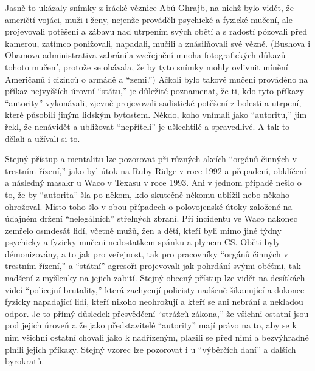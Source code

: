 \documentclass{book}
\begin{document}
Jasně to ukázaly snímky z irácké věznice Abú Ghrajb, na nichž bylo vidět, že američtí vojáci, muži i ženy, nejenže prováděli psychické a fyzické mučení, ale projevovali potěšení a zábavu nad utrpením svých obětí a s radostí pózovali před kamerou, zatímco ponižovali, napadali, mučili a znásilňovali své vězně. (Bushova i Obamova administrativa zabránila zveřejnění mnoha fotografických důkazů tohoto mučení, protože se obávala, že by tyto snímky mohly ovlivnit mínění Američanů i cizinců o armádě a \enquote{zemi.}) Ačkoli bylo takové mučení prováděno na příkaz nejvyšších úrovní \enquote{státu,} je důležité poznamenat, že ti, kdo tyto příkazy \enquote{autority} vykonávali, zjevně projevovali sadistické potěšení z bolesti a utrpení, které působili jiným lidským bytostem. Někdo, koho vnímali jako \enquote{autoritu,} jim řekl, že nenávidět a ubližovat \enquote{nepříteli} je ušlechtilé a spravedlivé. A tak to dělali a užívali si to.

Stejný přístup a mentalitu lze pozorovat při různých akcích \enquote{orgánů činných v trestním řízení,} jako byl útok na Ruby Ridge v roce 1992 a přepadení, obklíčení a následný masakr u Waco v Texasu v roce 1993. Ani v jednom případě nešlo o to, že by \enquote{autorita} šla po někom, kdo skutečně někomu ublížil nebo někoho ohrožoval. Místo toho šlo v obou případech o polovojenské útoky založené na údajném držení \enquote{nelegálních} střelných zbraní. Při incidentu ve Waco nakonec zemřelo osmdesát lidí, včetně mužů, žen a dětí, kteří byli mimo jiné týdny psychicky a fyzicky mučeni nedostatkem spánku a plynem CS. Oběti byly démonizovány, a to jak pro veřejnost, tak pro pracovníky \enquote{orgánů činných v trestním řízení,} a \enquote{státní} agresoři projevovali jak pohrdání svými oběťmi, tak nadšení z myšlenky na jejich zabití. Stejný obecný přístup lze vidět na desítkách videí \enquote{policejní brutality,} která zachycují policisty nadšeně šikanující a dokonce fyzicky napadající lidi, kteří nikoho neohrožují a kteří se ani nebrání a nekladou odpor. Je to přímý důsledek přesvědčení \enquote{strážců zákona,} že všichni ostatní jsou pod jejich úroveň a že jako představitelé \enquote{autority} mají právo na to, aby se k nim všichni ostatní chovali jako k nadřízeným, plazili se před nimi a bezvýhradně plnili jejich příkazy. Stejný vzorec lze pozorovat i u \enquote{výběrčích daní} a dalších byrokratů.
\end{document}
